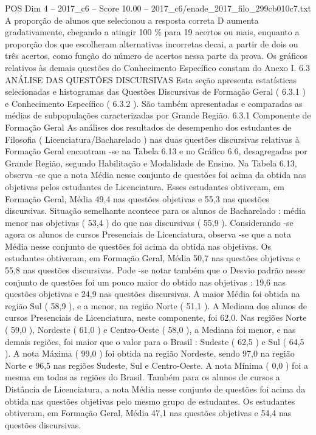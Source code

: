 \begin{textsample}{POS Dim 4 – 2017\_c6 – Score 10.00 – 2017\_c6/enade\_2017\_filo\_299cb010c7.txt}
A proporção de alunos que selecionou a resposta correta D aumenta gradativamente, chegando a atingir 100 \% para 19 acertos ou mais, enquanto a proporção dos que escolheram alternativas incorretas decai, a partir de dois ou três acertos, como função do número de acertos nessa parte da prova.
Os gráficos relativos às demais questões do Conhecimento Específico constam do Anexo I. 6.3 ANÁLISE DAS QUESTÕES DISCURSIVAS Esta seção apresenta estatísticas selecionadas e histogramas das Questões Discursivas de Formação Geral ( 6.3.1 ) e Conhecimento Específico ( 6.3.2 ).
São também apresentadas e comparadas as médias de subpopulações caracterizadas por Grande Região. 6.3.1 Componente de Formação Geral As análises dos resultados de desempenho dos estudantes de Filosofia ( Licenciatura/Bacharelado ) nas duas questões discursivas relativas à Formação Geral encontram -se na Tabela 6.13 e no Gráfico 6.6, desagregadas por Grande Região, segundo Habilitação e Modalidade de Ensino.
Na Tabela 6.13, observa -se que a nota Média nesse conjunto de questões foi acima da obtida nas objetivas pelos estudantes de Licenciatura.
Esses estudantes obtiveram, em Formação Geral, Média 49,4 nas questões objetivas e 55,3 nas questões discursivas.
Situação semelhante acontece para os alunos de Bacharelado : média menor nas objetivas ( 53,4 ) do que nas discursivas ( 55,9 ).
Considerando -se agora os alunos de cursos Presenciais de Licenciatura, observa -se que a nota Média nesse conjunto de questões foi acima da obtida nas objetivas.
Os estudantes obtiveram, em Formação Geral, Média 50,7 nas questões objetivas e 55,8 nas questões discursivas.
Pode -se notar também que o Desvio padrão nesse conjunto de questões foi um pouco maior do obtido nas objetivas : 19,6 nas questões objetivas e 24,9 nas questões discursivas.
A maior Média foi obtida na região Sul ( 58,9 ), e a menor, na região Norte ( 51,1 ).
A Mediana dos alunos de cursos Presenciais de Licenciatura, neste componente, foi 62,0.
Nas regiões Norte ( 59,0 ), Nordeste ( 61,0 ) e Centro-Oeste ( 58,0 ), a Mediana foi menor, e nas demais regiões, foi maior que o valor para o Brasil : Sudeste ( 62,5 ) e Sul ( 64,5 ).
A nota Máxima ( 99,0 ) foi obtida na região Nordeste, sendo 97,0 na região Norte e 96,5 nas regiões Sudeste, Sul e Centro-Oeste.
A nota Mínima ( 0,0 ) foi a mesma em todas as regiões do Brasil.
Também para os alunos de cursos a Distância de Licenciatura, a nota Média nesse conjunto de questões foi acima da obtida nas questões objetivas pelo mesmo grupo de estudantes.
Os estudantes obtiveram, em Formação Geral, Média 47,1 nas questões objetivas e 54,4 nas questões discursivas.

\end{textsample}
